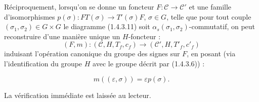 Réciproquement, lorsqu'on se donne un foncteur
$F\colon\mathcal C\to\mathcal C'$ et une famille d'isomorphismes
$p(\sigma)\colon FT(\sigma)\to T'(\sigma)F$, $\sigma\in G$, telle que
pour tout couple $(\sigma_1,\sigma_2)\in G\times G$ le diagramme
(1.4.3.11) soit $\alpha_s(\sigma_1,\sigma_2)$-commutatif, on peut
reconstruire d'une manière unique un $H$-foncteur :
\[
  (F,m)\colon(\mathcal C,H,T_f,c_f)
  \longrightarrow(\mathcal C',H,T'_f,c'_f)
\]
induisant l'opération canonique du groupe des signes sur $F$, en posant
(via l'identification du groupe $H$ avec le groupe décrit par
(1.4.3.6)) :

\begin{equation}
  m((\varepsilon,\sigma))=\varepsilon p(\sigma).
  \tag{1.4.3.12}
\end{equation}

La vérification immédiate est laissée au lecteur.
